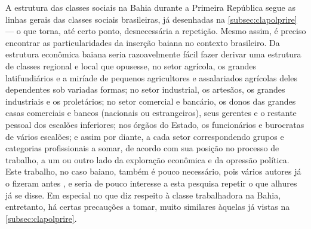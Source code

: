 A estrutura das classes sociais na Bahia durante a Primeira República segue as linhas gerais das classes sociais brasileiras, já desenhadas na \autoref{subsec:clapolprire} --- o que torna, até certo ponto, desnecessária a repetição. Mesmo assim, é preciso encontrar as particularidades da inserção baiana no contexto brasileiro. Da estrutura econômica baiana seria razoavelmente fácil fazer derivar uma estrutura de classes regional e local que opusesse, no setor agrícola, os grandes latifundiários e a miríade de pequenos agricultores e assalariados agrícolas deles dependentes sob variadas formas; no setor industrial, os artesãos, os grandes industriais e os proletários; no setor comercial e bancário, os donos das grandes casas comerciais e bancos (nacionais ou estrangeiros), seus gerentes e o restante pessoal dos escalões inferiores; nos órgãos do Estado, os funcionários e burocratas de vários escalões; e assim por diante, a cada setor correspondendo grupos e categorias profissionais a somar, de acordo com sua posição no processo de trabalho, a um ou outro lado da exploração econômica e da opressão política. Este trabalho, no caso baiano, também é pouco necessário, pois vários autores já o fizeram antes \cite{castellucci_salvador_2001,CPE1980,santos_repovo_2001,souza_fomerepublicassa_2019}, e seria de pouco interesse a esta pesquisa repetir o que alhures já se disse. Em especial no que diz respeito à classe trabalhadora na Bahia, entretanto, há certas precauções a tomar, muito similares àquelas já vistas na \autoref{subsec:clapolprire}.

